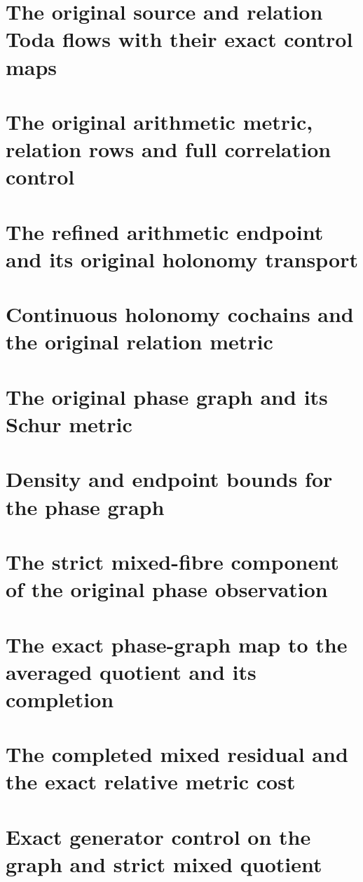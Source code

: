 \documentclass[11pt,a4paper,oneside,openany]{book}
\theoremstyle{definition}
\begin{document}
\chapter{The original source and relation Toda flows with their exact control maps}
\begingroup

\endgroup
\chapter{The original arithmetic metric, relation rows and full correlation control}
\begingroup

\endgroup
\chapter{The refined arithmetic endpoint and its original holonomy transport}
\begingroup

\endgroup
\chapter{Continuous holonomy cochains and the original relation metric}
\begingroup

\endgroup
\chapter{The original phase graph and its Schur metric}
\begingroup

\endgroup
\chapter{Density and endpoint bounds for the phase graph}
\begingroup

\endgroup
\chapter{The strict mixed-fibre component of the original phase observation}
\begingroup

\endgroup
\chapter{The exact phase-graph map to the averaged quotient and its completion}
\begingroup

\endgroup
\chapter{The completed mixed residual and the exact relative metric cost}
\begingroup

\endgroup
\chapter{Exact generator control on the graph and strict mixed quotient}
\begingroup

\endgroup
\end{document}
